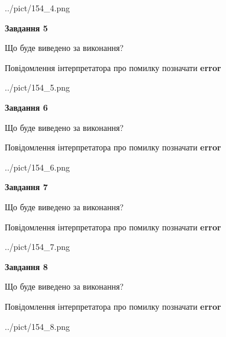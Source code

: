 \documentclass[12pt, ukrainian]{article}
\begin{document}
{\begin{center}
	{../pict/154_4.png}
\end{center}
\newpage

{\begin {center}\textbf{Завдання 5}\end {center}}\par
Що буде виведено за виконання? \par
Повідомлення інтерпретатора про помилку позначати \textbf{error}

\begin{center}
	{../pict/154_5.png}
\end{center}
\newpage

{\begin {center}\textbf{Завдання 6}\end {center}}\par
Що буде виведено за виконання? \par
Повідомлення інтерпретатора про помилку позначати \textbf{error}

\begin{center}
	{../pict/154_6.png}
\end{center}
\newpage

{\begin {center}\textbf{Завдання 7}\end {center}}\par
Що буде виведено за виконання? \par
Повідомлення інтерпретатора про помилку позначати \textbf{error}

\begin{center}
	{../pict/154_7.png}
\end{center}
\newpage

{\begin {center}\textbf{Завдання 8}\end {center}}\par
Що буде виведено за виконання? \par
Повідомлення інтерпретатора про помилку позначати \textbf{error}

\begin{center}
	{../pict/154_8.png}
\end{center}
\newpage

}
\end{document}
